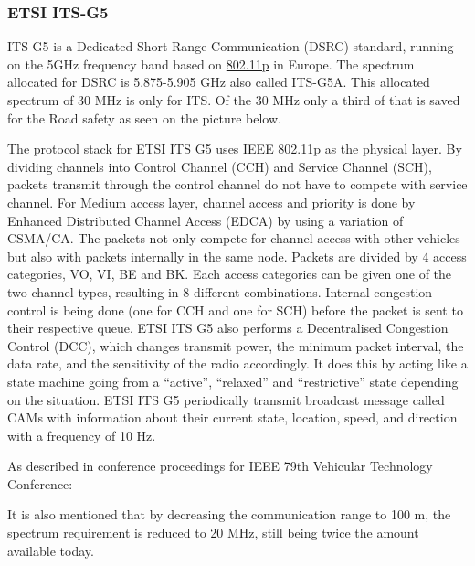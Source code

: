 \subsubsection{ETSI ITS-G5}
ITS-G5 is a Dedicated Short Range Communication (DSRC) standard, running on the 5GHz frequency band based on \hyperref[sec:802.11p]{802.11p} in Europe.
The spectrum allocated for DSRC is 5.875-5.905 GHz also called ITS-G5A. This allocated spectrum of 30 MHz is only for ITS. Of the 30 MHz only a third of that is saved for the Road safety as seen on the picture below.\par
% 
The protocol stack for ETSI ITS G5 uses IEEE 802.11p as the physical layer. By dividing channels into Control Channel (CCH) and Service Channel (SCH), packets transmit through the control channel do not have to compete with service channel. For Medium access layer, channel access and priority is done by Enhanced Distributed Channel Access (EDCA) by using a variation of CSMA/CA. The packets not only compete for channel access with other vehicles but also with packets internally in the same node. Packets are divided by 4 access categories, VO, VI, BE and BK. Each access categories can be given one of the two channel types, resulting in 8 different combinations. Internal congestion control is being done (one for CCH and one for SCH) before the packet is sent to their respective queue. ETSI ITS G5 also performs a Decentralised Congestion Control (DCC), which changes transmit power, the minimum packet interval, the data rate, and the sensitivity of the radio accordingly. It does this by acting like a state machine going from a “active”, “relaxed” and “restrictive” state depending on the situation.
ETSI ITS G5 periodically transmit broadcast message called CAMs with information about their current state, location, speed, and direction with a frequency of 10 Hz.\par
% 
As described in conference proceedings for IEEE 79th Vehicular Technology Conference: \par 
% 
It is also mentioned that by decreasing the communication range to 100 m, the spectrum requirement is reduced to 20 MHz, still being twice the amount available today. 